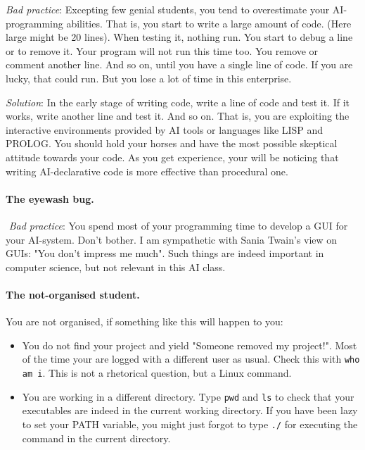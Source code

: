 \documentclass[a4paper,12pt]{report}
\begin{document}
{\it Bad practice}: Excepting few genial students, you tend to overestimate your AI-programming abilities. 
That is, you start to write a large amount of code. (Here large might be 20 lines).
When testing it, nothing run. 
You start to debug a line or to remove it.
Your program will not run this time too. 
You remove or comment another line. 
And so on, until you have a single line of code.
If you are lucky, that could run. 
But you lose a lot of time in this enterprise.

{\it Solution}: In the early stage of writing code, write a line of code and test it. 
If it works, write another line and test it. 
And so on. 
That is, you are exploiting the interactive environments provided by 
AI tools or languages like LISP and PROLOG.
You should hold your horses and 
have the most possible skeptical attitude towards your code.  
As you get experience, your will be noticing that writing 
AI-declarative code is more effective than procedural one.  


\paragraph{The eyewash bug.} $ $
{\it Bad practice}: You spend most of your programming time to develop a GUI for your AI-system. 
Don't bother. I am sympathetic with Sania Twain's view on GUIs: "You don't impress me much".
Such things are indeed important in computer science, but not relevant in this AI class.



\paragraph{The not-organised student.}
You are not organised, if something like this will happen to you:
\begin{itemize}
 \item You do not find your project and yield "Someone removed my project!". 
Most of the time your are logged with a different user as usual. 
Check this with \texttt{who am i}. 
This is not a rhetorical question, but a Linux command.
\item You are working in a different directory. 
Type \texttt{pwd} and \texttt{ls} to check that your executables are indeed in the current working directory.
If you have been lazy to set your PATH variable, you might just forgot to type \texttt{./} 
for executing the command in the current directory.
\end{itemize}
\end{document}

